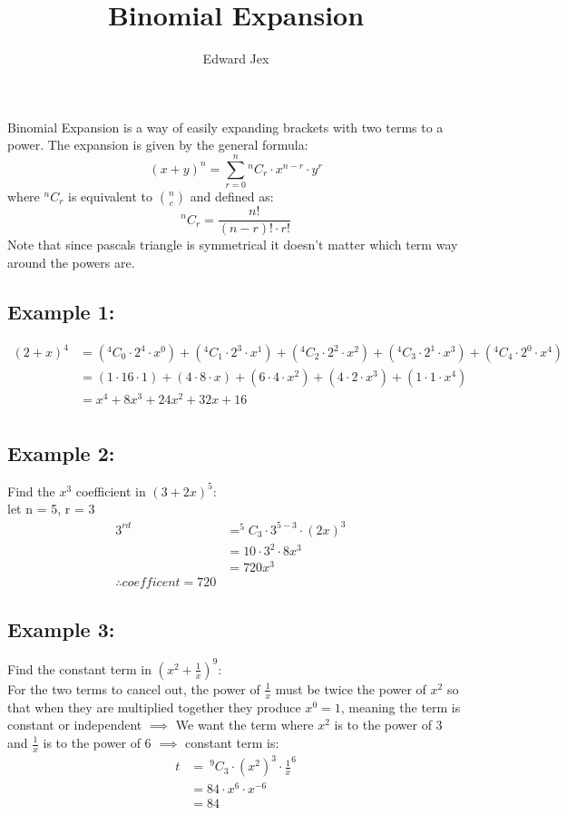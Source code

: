 \documentclass[a4paper,12pt,fleqn]{article}
\begin{document}
\title{Binomial Expansion}	
\author{Edward Jex}
\maketitle

Binomial Expansion is a way of easily expanding brackets with two terms to a power. The expansion is given by the general formula: 
\begin{equation*}
(x + y)^n = \sum_{r=0}^{n} ^nC_r \cdot x^{n-r} \cdot y^r
\end{equation*} 
where $^nC_r$ is equivalent to $\binom{n}{c}$ and defined as:
\begin{equation*}
^nC_r = \frac{n!}{(n-r)! \cdot r!}
\end{equation*}
Note that since pascals triangle is symmetrical it doesn't matter which term way around the powers are.

\subsection*{Example 1:}
\begin{align*}
(2 + x)^4  & =
  (^4C_0 \cdot 2^4 \cdot x^0) 
+ (^4C_1 \cdot 2^3 \cdot x^1) 
+ (^4C_2 \cdot 2^2 \cdot x^2) 
+ (^4C_3 \cdot 2^1 \cdot x^3) 
+ (^4C_4 \cdot 2^0 \cdot x^4)&\\
& =
  (1 \cdot 16 \cdot 1) 
+ (4 \cdot 8 \cdot x) 
+ (6 \cdot 4 \cdot x^2) 
+ (4 \cdot 2 \cdot x^3)
+ (1 \cdot 1 \cdot x^4)&\\
& = x^4 + 8x^3 + 24x^2 + 32x + 16&\\
\end{align*}

\subsection*{Example 2:}
Find the $x^3$ coefficient in $(3 + 2x)^5$:
\\
let n = 5, r = 3
\begin{align*}
3^{rd}\; & = ^5C_3 \cdot 3^{5-3} \cdot (2x)^3 &\\
 & = 10 \cdot 3^2 \cdot 8x^3 &\\
 & = 720x^3 &\\
\therefore coefficent = 720
\end{align*}

\subsection*{Example 3:}
Find the constant term in $(x^2 + \frac{1}{x})^9$:\\
For the two terms to cancel out, the power of $\frac{1}{x}$ must be twice the power of $x^2$ so that when they are multiplied together they produce $x^0 = 1$, meaning the term is constant or independent $\implies$ We want the term where $x^2$ is to the power of 3 and $\frac{1}{x}$ is to the power of 6 $\implies$ constant term is:
\begin{align*}
t & = \: ^9C_3 \cdot (x^2)^3 \cdot \frac{1}{x}^6\\
  & = 84 \cdot x^6 \cdot x^{-6}\\
  & = 84
\end{align*}
\end{document}
